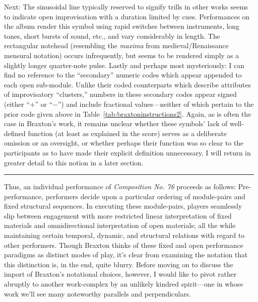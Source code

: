         Next: The sinusoidal line typically reserved to signify trills in other works seems to indicate open improvisation with a duration limited by cues. Performances on the album render this symbol using rapid switches between instruments, long tones, short bursts of sound, etc., and vary considerably in length. The rectangular notehead (resembling the \textit{maxima} from medieval/Renaissance mensural notation) occurs infrequently, but seems to be rendered simply as a slightly longer quarter-note pulse. Lastly and perhaps most mysteriously: I can find no reference to the ``secondary'' numeric codes which appear appended to each open sub-module. Unlike their coded counterparts which describe attributes of improvisatory ``clusters,'' numbers in these secondary codes appear signed (either ``$+$'' or ``$-$'') and include fractional values---neither of which pertain to the prior code given above in Table~\ref{tab:braxtoninstructions2}. Again, as is often the case in Braxton's work, it remains unclear whether these symbols' lack of well-defined function (at least as explained in the score) serves as a deliberate omission or an oversight, or whether perhaps their function was so clear to the participants as to have made their explicit definition unnecessary. I will return in greater detail to this notion in a later section.

            \begin{center}
            \vspace{-10pt}
            \noindent\rule{3cm}{0.4pt}
            \end{center}

        Thus, an individual performance of \textit{Composition No. 76} proceeds as follows: Pre-performance, performers decide upon a particular ordering of module-pairs and fixed structural sequences. In executing these module-pairs, players seamlessly slip between engagement with more restricted linear interpretation of fixed materials and omnidirectional interpretation of open materials; all the while maintaining certain temporal, dynamic, and structural relations with regard to other performers. Though Braxton thinks of these fixed and open performance paradigms as distinct modes of play, it's clear from examining the notation that this distinction is, in the end, quite blurry. Before moving on to discuss the import of Braxton's notational choices, however, I would like to pivot rather abruptly to another work-complex by an unlikely kindred spirit---one in whose work we'll see many noteworthy parallels and perpendiculars.
    
